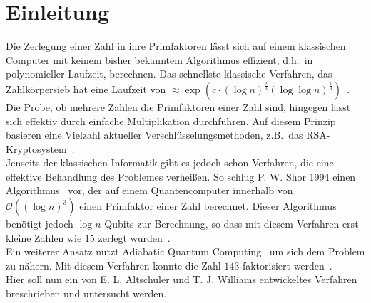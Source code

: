 \chapter{Einleitung}
Die Zerlegung einer Zahl in ihre Primfaktoren lässt sich auf einem klassischen Computer mit keinem bisher bekanntem Algorithmus effizient, d.h.\ in polynomieller Laufzeit, berechnen. Das schnellste klassische Verfahren, das Zahlkörpersieb hat eine Laufzeit von $\approx\exp\left(c\cdot{\left(\log n\right)}^\frac{2}{3}{\left(\log\log n\right)}^\frac{1}{3}\right)$~\parencite{pomerance}.\\
Die Probe, ob mehrere Zahlen die Primfaktoren einer Zahl sind, hingegen lässt sich effektiv durch einfache Multiplikation durchführen. Auf diesem Prinzip basieren eine Vielzahl aktueller Verschlüsselungsmethoden, z.B.\ das RSA-Kryptosystem~\parencite{rsa}. \\
Jenseits der klassischen Informatik gibt es jedoch schon Verfahren, die eine effektive Behandlung des Problemes verheißen. So schlug P. W. Shor 1994 einen Algorithmus~\parencite{shor} vor, der auf einem Quantencomputer innerhalb von $\mathcal{O}\left({\left(\log n\right)}^3\right)$ einen Primfaktor einer Zahl berechnet. Dieser Algorithmus benötigt jedoch $\log n$ Qubits zur Berechnung, so dass mit diesem Verfahren erst kleine Zahlen wie $15$ zerlegt wurden~\parencite{vandersypen}.\\
Ein weiterer Ansatz nutzt Adiabatic Quantum Computing~\parencite{suter} um sich dem Problem zu nähern. Mit diesem Verfahren konnte die Zahl $143$ faktorisiert werden~\parencite{xu}. \\
Hier soll nun ein von E. L. Altschuler und T. J. Williams entwickeltes Verfahren~\parencite{altschuler} breschrieben und untersucht werden.
